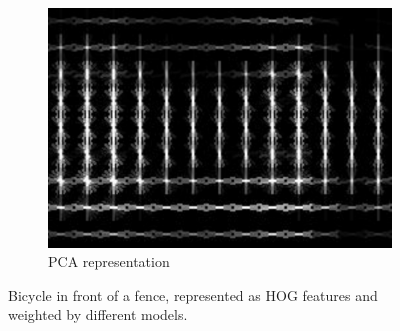 \begin{figure}
\begin{subfigure}[b]{0.3\textwidth}
\includegraphics[width=\textwidth]{images/whitened_hog_pca}
\caption[PCA representation]{\acs{PCA} representation}
\label{fig:whitened_hog:pca}
\end{subfigure}
\caption{Bicycle in front of a fence, represented as \ac{HOG} features and weighted by different models.}
\label{fig:whitened_hog}
\end{figure}
